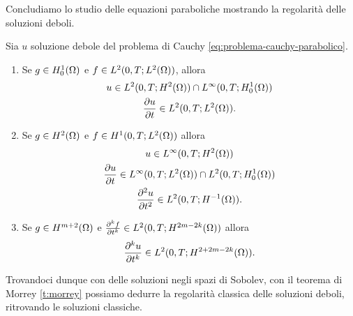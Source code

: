 Concludiamo lo studio delle equazioni paraboliche mostrando la regolarità delle soluzioni deboli.
\begin{teorema} \label{t:regolarita-soluzioni-deboli-paraboliche}
    Sia $u$ soluzione debole del problema di Cauchy \eqref{eq:problema-cauchy-parabolico}.
    \begin{enumerate}
        \item Se $g\in\sobHc[1]{\Omega}$ e $f\in\leb[2]{0,T;\leb[2]{\Omega}}$, allora
            \begin{gather*}
                u\in\leb[2]{0,T;\sobH[2]{\Omega}}\cap\leb[\infty]{0,T;\sobHc[1]{\Omega}}\\
                \drp{u}{t}\in\leb[2]{0,T;\leb[2]{\Omega}}.
            \end{gather*}
        \item Se $g\in\sobH[2]{\Omega}$ e $f\in\sobH[1]{0,T;\leb[2]{\Omega}}$ allora
            \begin{gather*}
                u\in\leb[\infty]{0,T;\sobH[2]{\Omega}}\\
                \drp{u}{t}\in\leb[\infty]{0,T;\leb[2]{\Omega}}\cap\leb[2]{0,T;\sobHc[1]{\Omega}}\\
                \ddrp{u}{t}\in\leb[2]{0,T;\sobH[-1]{\Omega}}.
            \end{gather*}
        \item Se $g\in\sobH[m+2]{\Omega}$ e $\frac{\partial^k f}{\partial t^k}\in\leb[2]{0,T;\sobH[2m-2k]{\Omega}}$ allora
            \begin{gather*}
                \frac{\partial^k u}{\partial t^k}\in\leb[2]{0,T;\sobH[2+2m-2k]{\Omega}}.
            \end{gather*}
    \end{enumerate}
\end{teorema}
Trovandoci dunque con delle soluzioni negli spazi di Sobolev, con il teorema di Morrey \ref{t:morrey} possiamo dedurre la regolarità classica delle soluzioni deboli, ritrovando le soluzioni classiche.

